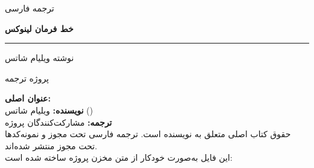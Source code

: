 \documentclass[11pt,a4paper,twoside,openright]{book}
\begin{document}
\frontmatter
\begin{titlepage}
  \centering
  \vspace*{2cm}
  {\large\color{muted} ترجمه فارسی\par}
  \vspace{1.2cm}
  {\fontsize{34}{44}\selectfont\bfseries\color{accent} خط فرمان لینوکس\par}
  \vspace{0.6cm}
  {\Large{}\par}
  \vspace{0.8cm}
  {\color{accent}\rule{0.35\textwidth}{1.2pt}\par}
  \vspace{0.8cm}
  {\large نوشته ویلیام شاتس\par}
  \vfill
  {\normalsize پروژه ترجمه \par}
  \vspace{2pt}
  {\small{}\par}
\end{titlepage}

\thispagestyle{empty}
\vspace*{\fill}
{\small
\noindent\textbf{عنوان اصلی:} \\
\textbf{نویسنده:} ویلیام شاتس ()\\
\textbf{ترجمه:} مشارکت‌کنندگان پروژه \\[1em]
حقوق کتاب اصلی متعلق به نویسنده است. ترجمه فارسی تحت مجوز
 و نمونه‌کدها تحت مجوز  منتشر شده‌اند.\\[1em]
این فایل به‌صورت خودکار از متن مخزن پروژه ساخته شده است:\\
\par}

\cleardoublepage
\tableofcontents

\mainmatter

\end{document}
